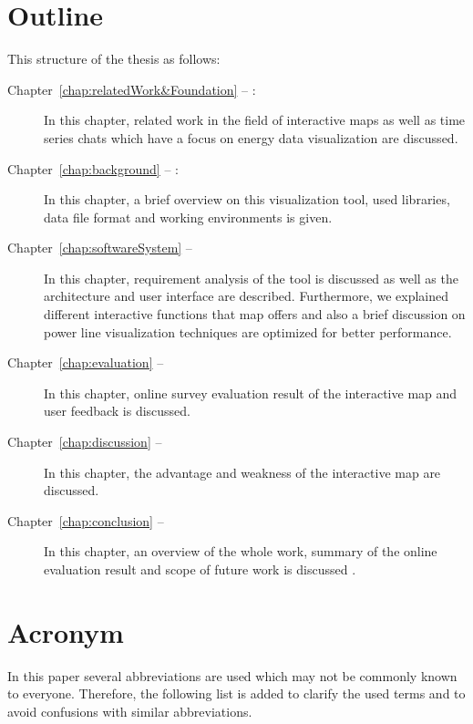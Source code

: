 \section*{Outline}
This structure of the thesis as follows:
\begin{description}

\item[Chapter~\ref{chap:relatedWork&Foundation} -- :] In this chapter, related work in the field of interactive maps as well as time series chats which have a focus on energy data visualization are discussed. 

\item[Chapter~\ref{chap:background} -- :] In this chapter, a brief overview on this visualization tool, used libraries, data file format and working environments is given.

\item[Chapter~\ref{chap:softwareSystem} -- ] In this chapter, requirement analysis of the tool is discussed as well as the architecture and user interface are described. Furthermore, we explained different interactive functions that map offers and also a brief discussion on power line visualization techniques are optimized for better performance. 
 
\item[Chapter~\ref{chap:evaluation} -- ] In this chapter, online survey evaluation result of the interactive map and user feedback is discussed.   

\item[Chapter~\ref{chap:discussion} -- ] In this chapter, the advantage and weakness of the interactive map are discussed.

\item[Chapter~\ref{chap:conclusion} -- ] In this chapter, an overview of the whole work, summary of the online evaluation result and scope of future work is discussed .

\end{description}

\section*{Acronym}
In this paper several abbreviations are used which may not be commonly known to everyone. Therefore, the following list is added to clarify the used terms and to avoid confusions with similar abbreviations. 

